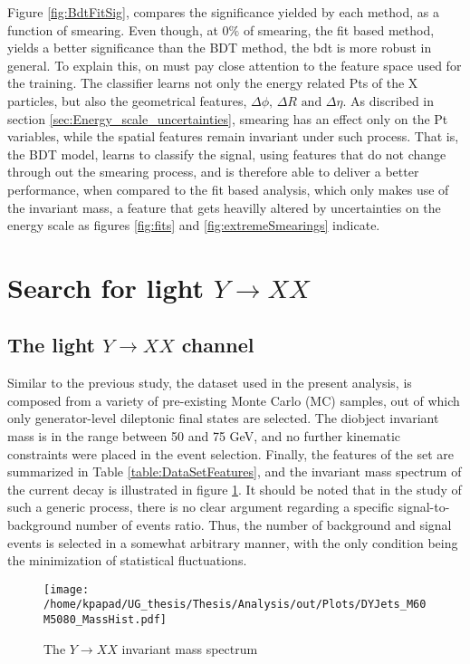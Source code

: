 Figure \ref{fig:BdtFitSig}, compares the significance yielded by each method, as a function of smearing. 
Even though, at \(0\%\) of smearing, the fit based method, yields a better significance than the BDT method, the bdt is more robust in general. To explain this, on must pay close attention to the feature space used for the training. The classifier learns not only the energy related Pts of the X particles, but also the geometrical features, \(\Delta\phi\text{, }\Delta R\text{ and }\Delta\eta\). As discribed in section \ref{sec:Energy_scale_uncertainties}, smearing has an effect only on the Pt variables, while the spatial features remain invariant under such process. That is, the BDT model, learns to classify the signal, using features that do not change through out the smearing process, and is therefore able to deliver a better performance, when compared to the fit based analysis, which only makes use of the invariant mass, a feature that gets heavilly altered by uncertainties on the energy scale as figures \ref{fig:fits} and \ref{fig:extremeSmearings} indicate. 


\section{Search for light \(Y \rightarrow XX\)}
\label{sec:org59adc41}
\label{sec:Light_search_Y_to_XX}
\subsection{The light \(Y\rightarrow XX\) channel}
\label{sec:orgabd932d}
\label{Light_y_to_xx}
Similar to the previous study, the dataset used in the present analysis, is composed from a variety of pre-existing Monte Carlo (MC) samples, out of which only generator-level dileptonic final states are selected. The diobject invariant mass is in the range between 50 and 75 GeV, and no further kinematic constraints were placed in the event selection. Finally, the features of the set are summarized in Table \ref{table:DataSetFeatures}, and the invariant mass spectrum of the current decay is illustrated in figure \ref{fig:LightMassSpectrum}. It should be noted that in the study of such a generic process, there is no clear argument regarding a specific signal-to-background number of events ratio. Thus, the number of background and signal events is selected in a somewhat arbitrary manner, with the only condition being the minimization of statistical fluctuations.
\begin{figure}[h!]
\centering
\texttt{[image: /home/kpapad/UG\_thesis/Thesis/Analysis/out/Plots/DYJets\_M60M5080\_MassHist.pdf]}
\caption{The $Y\rightarrow XX$ invariant mass spectrum}
\label{fig:LightMassSpectrum}
\end{figure}

